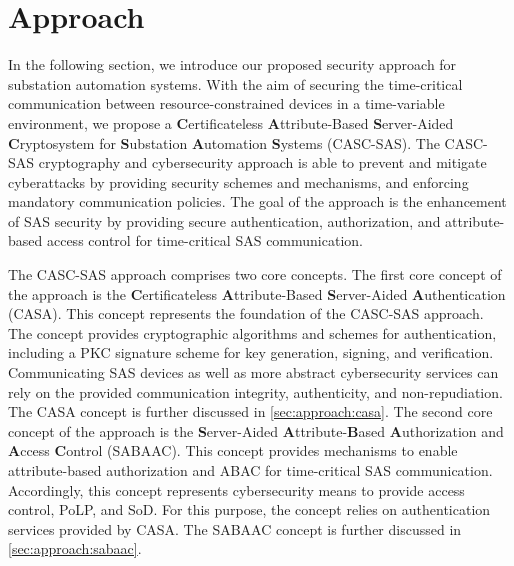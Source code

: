 \chapter{Approach}
\label{ch:approach}
In the following section, we introduce our proposed security approach for substation automation systems.
With the aim of securing the time-critical communication between resource-constrained devices in a time-variable environment, we propose a \textbf{C}ertificateless \textbf{A}ttribute-Based \textbf{S}erver-Aided \textbf{C}ryptosystem for \textbf{S}ubstation \textbf{A}utomation \textbf{S}ystems (CASC-SAS).
The CASC-SAS cryptography and cybersecurity approach is able to prevent and mitigate cyberattacks by providing security schemes and mechanisms, and enforcing mandatory communication policies.
The goal of the approach is the enhancement of SAS security by providing secure authentication, authorization, and attribute-based access control for time-critical SAS communication.

The CASC-SAS approach comprises two core concepts.
The first core concept of the approach is the \textbf{C}ertificateless \textbf{A}ttribute-Based \textbf{S}erver-Aided \textbf{A}uthentication (CASA).
This concept represents the foundation of the CASC-SAS approach.
The concept provides cryptographic algorithms and schemes for authentication, including a PKC signature scheme for key generation, signing, and verification.
Communicating SAS devices as well as more abstract cybersecurity services can rely on the provided communication integrity, authenticity, and non-repudiation.
The CASA concept is further discussed in \autoref{sec:approach:casa}.
The second core concept of the approach is the \textbf{S}erver-Aided \textbf{A}ttribute-\textbf{B}ased \textbf{A}uthorization and \textbf{A}ccess \textbf{C}ontrol (SABAAC).
This concept provides mechanisms to enable attribute-based authorization and ABAC for time-critical SAS communication.
Accordingly, this concept represents cybersecurity means to provide access control, PoLP, and SoD.
For this purpose, the concept relies on authentication services provided by CASA.
The SABAAC concept is further discussed in \autoref{sec:approach:sabaac}.

